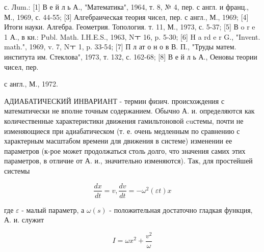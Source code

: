 \documentclass[10pt]{article}
\begin{document}
с. Лum.: [1] В е й л ь А., "Математика", 1964, т. 8, № 4, пер. с англ. и франц., М., 1969, с. 44-55; [3] Алгебраическая теория чисел, пер. с англ., М., 1969; [4] Итоги науки. Алгебра. Геометрия. Топология. т. 11, М., 1973, с. 5-37; [5] В o r e 1 А., в кн.: Publ. Math. I.H.E.S., 1963, Nㅜ 16, p. 5-30; [6] H a rd e r G., "Invent. math.", 1969, v. 7, Nㅜ 1, p. 33-54; [7] П л ат о н о в В. П., "Труды матем. института им. Стеклова", 1973, т. 132, с. 162-68; [8] В е й л ь А., Оеновы теории чисел, пер.

с англ., М., 1972.



АДИАБАТИЧЕСКИЙ ИНВАРИАНТ - термин физич. происхождения с математически не вполне точным содержанием. Обычно А. и. определяются как количественные характеристики движения гамильтоновой cuстемы, почти не изменяющиеся при адиабатическом (т. е. очень медленным по сравнению с характерным масштабом времени для движения в системе) изменении ее параметров (к-рое может продолжаться столь долго, что значения самих этих параметров, в отличие от А. и., значительно изменяются). Так, для простейшей системы



\[

\frac{d x}{d t}=v, \frac{d v}{d t}=-\omega^{2}(\varepsilon t) x

\]



где $\varepsilon$ - малый параметр, а $\omega(s)$ - положительная достаточно гладкая функция, А. и. служит



\[

I=\omega x^{2}+\frac{v^{2}}{\omega}

\]
\end{document}
